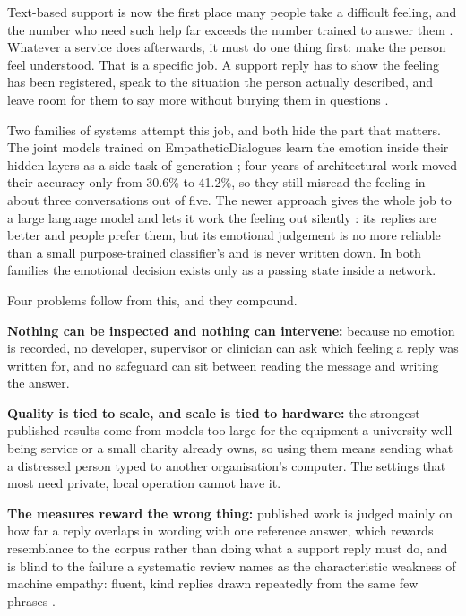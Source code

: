 Text-based support is now the first place many people take a difficult feeling, and the number who need such help far exceeds the number trained to answer them \cite{who2022report}. Whatever a service does afterwards, it must do one thing first: make the person feel understood. That is a specific job. A support reply has to show the feeling has been registered, speak to the situation the person actually described, and leave room for them to say more without burying them in questions \cite{samhsa2019tip35,sharma2020epitome}.

Two families of systems attempt this job, and both hide the part that matters. The joint models trained on EmpatheticDialogues learn the emotion inside their hidden layers as a side task of generation \cite{lin2019moel,majumder2020mime,sabour2022cem,zhou2023case}; four years of architectural work moved their accuracy only from 30.6\% to 41.2\%, so they still misread the feeling in about three conversations out of five. The newer approach gives the whole job to a large language model and lets it work the feeling out silently \cite{qian2023llm,loh2023harnessing}: its replies are better and people prefer them, but its emotional judgement is no more reliable than a small purpose-trained classifier's \cite{feng2023affect,belay2025} and is never written down. In both families the emotional decision exists only as a passing state inside a network.

Four problems follow from this, and they compound.

\textbf{Nothing can be inspected and nothing can intervene:} because no emotion is recorded, no developer, supervisor or clinician can ask which feeling a reply was written for, and no safeguard can sit between reading the message and writing the answer.

\textbf{Quality is tied to scale, and scale is tied to hardware:} the strongest published results come from models too large for the equipment a university well-being service or a small charity already owns, so using them means sending what a distressed person typed to another organisation's computer. The settings that most need private, local operation cannot have it.

\textbf{The measures reward the wrong thing:} published work is judged mainly on how far a reply overlaps in wording with one reference answer, which rewards resemblance to the corpus rather than doing what a support reply must do, and is blind to the failure a systematic review names as the characteristic weakness of machine empathy: fluent, kind replies drawn repeatedly from the same few phrases \cite{sorin2024jmir}.

